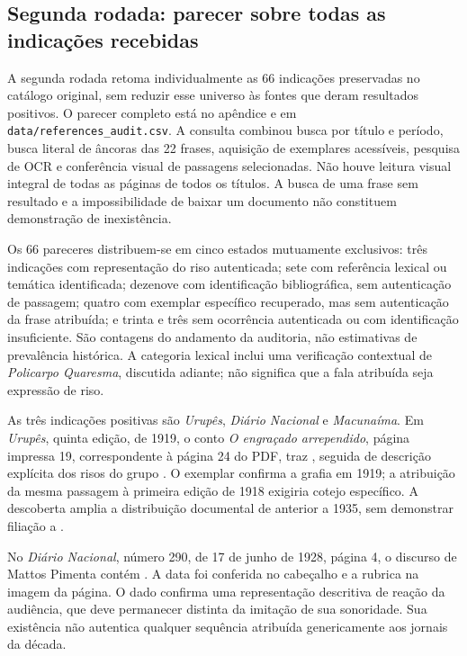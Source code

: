 \subsection{Segunda rodada: parecer sobre todas as indicações recebidas}
A segunda rodada retoma individualmente as 66 indicações preservadas no catálogo original, sem reduzir esse universo às fontes que deram resultados positivos. O parecer completo está no apêndice e em \texttt{data/references\_audit.csv}. A consulta combinou busca por título e período, busca literal de âncoras das 22 frases, aquisição de exemplares acessíveis, pesquisa de OCR e conferência visual de passagens selecionadas. Não houve leitura visual integral de todas as páginas de todos os títulos. A busca de uma frase sem resultado e a impossibilidade de baixar um documento não constituem demonstração de inexistência.

Os 66 pareceres distribuem-se em cinco estados mutuamente exclusivos: três indicações com representação do riso autenticada; sete com referência lexical ou temática identificada; dezenove com identificação bibliográfica, sem autenticação de passagem; quatro com exemplar específico recuperado, mas sem autenticação da frase atribuída; e trinta e três sem ocorrência autenticada ou com identificação insuficiente. São contagens do andamento da auditoria, não estimativas de prevalência histórica. A categoria lexical inclui uma verificação contextual de \textit{Policarpo Quaresma}, discutida adiante; não significa que a fala atribuída seja expressão de riso.

As três indicações positivas são \textit{Urupês}, \textit{Diário Nacional} e \textit{Macunaíma}. Em \textit{Urupês}, quinta edição, de 1919, o conto \textit{O engraçado arrependido}, página impressa 19, correspondente à página 24 do PDF, traz , seguida de descrição explícita dos risos do grupo \cite{lobato1919}. O exemplar confirma a grafia em 1919; a atribuição da mesma passagem à primeira edição de 1918 exigiria cotejo específico. A descoberta amplia a distribuição documental de  anterior a 1935, sem demonstrar filiação a .

No \textit{Diário Nacional}, número 290, de 17 de junho de 1928, página 4, o discurso de Mattos Pimenta contém  \cite{diarionacional1928}. A data foi conferida no cabeçalho e a rubrica na imagem da página. O dado confirma uma representação descritiva de reação da audiência, que deve permanecer distinta da imitação de sua sonoridade. Sua existência não autentica qualquer sequência  atribuída genericamente aos jornais da década.

